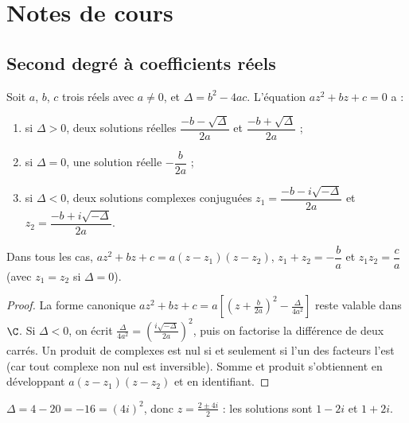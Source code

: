 \mxnewpage
\section{Notes de cours}
\subsection{Second degré à coefficients réels}
\begin{theorem}
Soit $a$, $b$, $c$ trois réels avec $a\neq0$, et $\Delta=b^2-4ac$. L'équation $az^2+bz+c=0$ a :
\begin{enumerate}
\item si $\Delta>0$, deux solutions réelles $\dfrac{-b-\sqrt\Delta}{2a}$ et $\dfrac{-b+\sqrt\Delta}{2a}$ ;
\item si $\Delta=0$, une solution réelle $-\dfrac b{2a}$ ;
\item si $\Delta<0$, deux solutions complexes conjuguées $z_1=\dfrac{-b-i\sqrt{-\Delta}}{2a}$ et $z_2=\dfrac{-b+i\sqrt{-\Delta}}{2a}$.
\end{enumerate}
Dans tous les cas, $az^2+bz+c=a(z-z_1)(z-z_2)$, $z_1+z_2=-\dfrac ba$ et $z_1z_2=\dfrac ca$ (avec $z_1=z_2$ si $\Delta=0$).
\end{theorem}
\begin{proof}
La forme canonique $az^2+bz+c=a\left[\left(z+\frac b{2a}\right)^2-\frac\Delta{4a^2}\right]$ reste valable dans $\C$. Si $\Delta<0$, on écrit $\frac{\Delta}{4a^2}=\left(\frac{i\sqrt{-\Delta}}{2a}\right)^2$, puis on factorise la différence de deux carrés. Un produit de complexes est nul si et seulement si l'un des facteurs l'est (car tout complexe non nul est inversible). Somme et produit s'obtiennent en développant $a(z-z_1)(z-z_2)$ et en identifiant.
\end{proof}
\begin{example}[Résoudre $z^2-2z+5=0$]
$\Delta=4-20=-16=(4i)^2$, donc $z=\frac{2\pm4i}2$ : les solutions sont $1-2i$ et $1+2i$.
\end{example}

